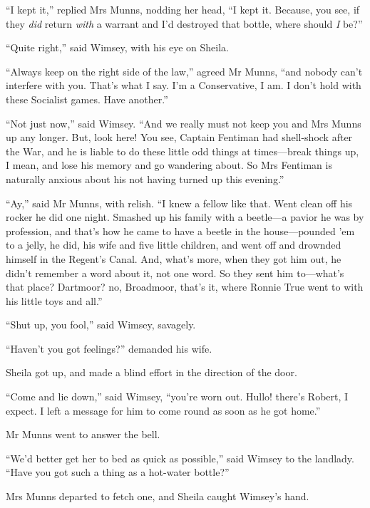 \enquote{I kept it,} replied Mrs Munns, nodding her head, \enquote{I kept it. Because, you see, if they \textit{did} return \textit{with} a warrant and I'd destroyed that bottle, where should \textit{I} be?}

\enquote{Quite right,} said Wimsey, with his eye on Sheila.

\enquote{Always keep on the right side of the law,} agreed Mr Munns, \enquote{and nobody can't interfere with you. That's what I say. I'm a Conservative, I am. I don't hold with these Socialist games. Have another.}

\enquote{Not just now,} said Wimsey. \enquote{And we really must not keep you and Mrs Munns up any longer. But, look here! You see, Captain Fentiman had shell-shock after the War, and he is liable to do these little odd things at times\allowbreak---\allowbreak break things up, I mean, and lose his memory and go wandering about. So Mrs Fentiman is naturally anxious about his not having turned up this evening.}

\enquote{Ay,} said Mr Munns, with relish. \enquote{I knew a fellow like that. Went clean off his rocker he did one night. Smashed up his family with a beetle\allowbreak---\allowbreak a pavior he was by profession, and that's how he came to have a beetle in the house\allowbreak---\allowbreak pounded 'em to a jelly, he did, his wife and five little children, and went off and drownded himself in the Regent's Canal. And, what's more, when they got him out, he didn't remember a word about it, not one word. So they sent him to\allowbreak---\allowbreak what's that place? Dartmoor? no, Broadmoor, that's it, where Ronnie True went to with his little toys and all.}

\enquote{Shut up, you fool,} said Wimsey, savagely.

\enquote{Haven't you got feelings?} demanded his wife.

Sheila got up, and made a blind effort in the direction of the door.

\enquote{Come and lie down,} said Wimsey, \enquote{you're worn out. Hullo! there's Robert, I expect. I left a message for him to come round as soon as he got home.}

Mr Munns went to answer the bell.

\enquote{We'd better get her to bed as quick as possible,} said Wimsey to the landlady. \enquote{Have you got such a thing as a hot-water bottle?}

Mrs Munns departed to fetch one, and Sheila caught Wimsey's hand.

